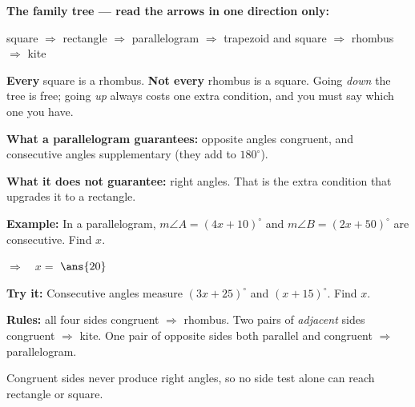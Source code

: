 \documentclass[12pt]{article}
\begin{document}

\begin{formulabox}
\textbf{The family tree --- read the arrows in one direction only:}\par
square $\Rightarrow$ rectangle $\Rightarrow$ parallelogram $\Rightarrow$ trapezoid \quad and \quad square $\Rightarrow$ rhombus $\Rightarrow$ kite\par
\textbf{Every} square is a rhombus. \textbf{Not every} rhombus is a square. Going \emph{down} the tree is free; going \emph{up} always costs one extra condition, and you must say which one you have.
\end{formulabox}


\begin{formulabox}
\textbf{What a parallelogram guarantees:} opposite angles congruent, and consecutive angles supplementary (they add to $180^\circ$).\par
\textbf{What it does not guarantee:} right angles. That is the extra condition that upgrades it to a rectangle.
\end{formulabox}

\begin{examplebox}
\textbf{Example:} \quad In a parallelogram, $m\angle A = (4x + 10)^\circ$ and $m\angle B = (2x + 50)^\circ$ are consecutive. Find $x$.

$\Rightarrow\quad x = $ $\ans{20}$
\end{examplebox}

\begin{tryitbox}
\textbf{Try it:} \quad Consecutive angles measure $(3x + 25)^\circ$ and $(x + 15)^\circ$. Find $x$.\\[2pt]
\end{tryitbox}


\begin{formulabox}
\textbf{Rules:} all four sides congruent $\Rightarrow$ rhombus. Two pairs of \emph{adjacent} sides congruent $\Rightarrow$ kite. One pair of opposite sides both parallel and congruent $\Rightarrow$ parallelogram.\par
Congruent sides never produce right angles, so no side test alone can reach rectangle or square.
\end{formulabox}
\end{document}
